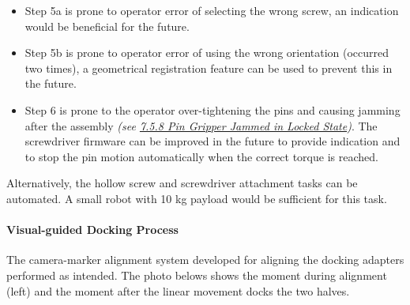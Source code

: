\documentclass[11pt]{book}
\begin{document}
\begin{itemize}
	\item Step 5a is prone to operator error of selecting the wrong screw, an indication would be beneficial for the future.

	\item Step 5b is prone to operator error of using the wrong orientation (occurred two times), a geometrical registration feature can be used to prevent this in the future.

	\item Step 6 is prone to the operator over-tightening the pins and causing jamming after the assembly \textit{(see \uline{7.5.8 Pin Gripper Jammed in Locked State})}. The screwdriver firmware can be improved in the future to provide indication and to stop the pin motion automatically when the correct torque is reached.

\end{itemize}
Alternatively, the hollow screw and screwdriver attachment tasks can be automated. A small robot with 10 kg payload would be sufficient for this task.

\paragraph{Visual-guided Docking Process}

The camera-marker alignment system developed for aligning the docking adapters performed as intended. The photo belows shows the moment during alignment (left) and the moment after the linear movement docks the two halves. 
\end{document}
